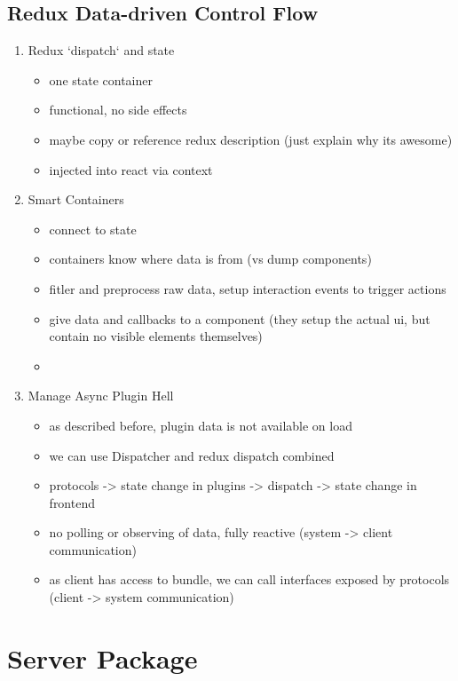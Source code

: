 \documentclass[../ClassicThesis.tex]{subfiles}
\begin{document}
\subsection{Redux Data-driven Control Flow}

\begin{enumerate}
\item Redux `dispatch` and state
  \begin{itemize}
  \item one state container
  \item functional, no side effects
  \item maybe copy or reference redux description (just explain why its awesome)
  \item injected into react via context
  \end{itemize}

\item Smart Containers
  \begin{itemize}
  \item connect to state
  \item containers know where data is from (vs dump components)
  \item fitler and preprocess raw data, setup interaction events to trigger
    actions
  \item give data and callbacks to a component (they setup the actual ui, but
    contain no visible elements themselves)
  \item {}
  \end{itemize}

\item Manage Async Plugin Hell
  \begin{itemize}
  \item as described before, plugin data is not available on load
  \item we can use Dispatcher and redux dispatch combined
  \item protocols -> state change in plugins -> dispatch -> state change in
    frontend
  \item no polling or observing of data, fully reactive (system -> client communication)
  \item as client has access to bundle, we can call interfaces exposed by
    protocols (client -> system communication)
  \end{itemize}
\end{enumerate}

\section{Server Package}
\end{document}
